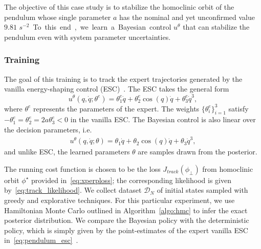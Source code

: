 The objective of this case study is to stabilize the homoclinic orbit of the
pendulum whose single parameter $a$ has the nominal and yet unconfirmed value
$9.81$ \unit{$s^{-2}$}. To this end, we learn a Bayesian control $u^\theta$ that
can stabilize the pendulum even with system parameter uncertainties.

\subsubsection{Training} 
The goal of this training is to track the expert trajectories generated by the
vanilla energy-shaping control (ESC)~\cite{underactuated}. The ESC takes the
general form
%
\begin{equation}
    u^\theta(q, \dot{q}; \theta^e) = \theta^e_1 \dot{q} + \theta^e_2 \cos{(q)} \dot{q} + \theta^e_3 \dot{q}^3,
    \label{eq:pendulum_esc}
\end{equation}
%
where $\theta^e$ represents the parameters of the expert. The weights
$\{\theta^e_i\}_{i=1}^3$ satisfy $-\theta^e_1 = \theta^e_2 = 2a \theta^e_3 < 0$
in the vanilla ESC. 
%
The Bayesian control is also linear over the decision parameters, i.e.
\begin{align*}
    u^\theta(q, \dot{q}; \theta) = \theta_1 \dot{q} + \theta_2 \cos{(q)} \dot{q} + \theta_3 \dot{q}^3,
\end{align*}
and unlike ESC, the learned parameters $\theta$ are samples drawn from the posterior.


The running cost function is chosen to be the loss $J_{track}(\phi_\bot)$ from
homoclinic orbit $\phi^\star$ provided in~\eqref{eq:xperploss}; the
corresponding likelihood is given by~\eqref{eq:track_likelihood}. We collect
dataset $\mathcal{D}_N$ of initial states sampled with greedy and explorative
techniques. For this particular experiment, we use Hamiltonian Monte Carlo
outlined in Algorithm~\ref{algo:hmc} to infer the exact posterior distribution.
We compare the Bayesian policy with the deterministic policy, which is simply
given by the point-estimates of the expert vanilla ESC
in~\eqref{eq:pendulum_esc}~\cite{acc}.


